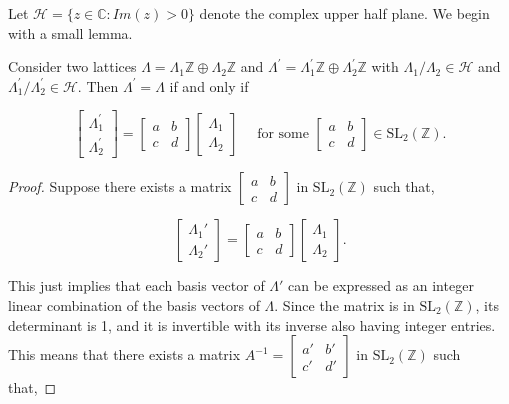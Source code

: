 Let $\mathcal{H}= \{ z \in \mathbb{C} : Im(z) > 0 \}$ denote the complex upper half plane. We begin with a small lemma.
\begin{lemma}
Consider two lattices $\Lambda=\Lambda_{1} \mathbb{Z} \oplus \Lambda_{2} \mathbb{Z}$ and $\Lambda^{\prime}=\Lambda_{1}^{\prime} \mathbb{Z} \oplus \Lambda_{2}^{\prime} \mathbb{Z}$ with $\Lambda_{1} / \Lambda_{2} \in \mathcal{H}$ and $\Lambda_{1}^{\prime} / \Lambda_{2}^{\prime} \in \mathcal{H}$. Then $\Lambda^{\prime}=\Lambda$ if and only if

$$
\left[\begin{array}{l}
\Lambda_{1}^{\prime} \\
\Lambda_{2}^{\prime}
\end{array}\right]=\left[\begin{array}{ll}
a & b \\
c & d
\end{array}\right]\left[\begin{array}{l}
\Lambda_{1} \\
\Lambda_{2}
\end{array}\right] \quad \text { for some }\left[\begin{array}{ll}
a & b \\
c & d
\end{array}\right] \in \mathrm{SL}_{2}(\mathbb{Z}) .
$$
\begin{proof}

Suppose there exists a matrix \( \left[\begin{array}{cc} a & b \\ c & d \end{array}\right] \) in \(\mathrm{SL}_2(\mathbb{Z})\) such that,

\[ \left[\begin{array}{c} \Lambda_1' \\ \Lambda_2' \end{array}\right] = \left[\begin{array}{cc} a & b \\ c & d \end{array}\right] \left[\begin{array}{c} \Lambda_1 \\ \Lambda_2 \end{array}\right]. \]

This just implies that each basis vector of \(\Lambda'\) can be expressed as an integer linear combination of the basis vectors of \(\Lambda\). Since the matrix is in \(\mathrm{SL}_2(\mathbb{Z})\), its determinant is 1, and it is invertible with its inverse also having integer entries. This means that there exists a matrix $A^{-1}=$\( \left[\begin{array}{cc} a' & b' \\ c' & d' \end{array}\right] \) in \(\mathrm{SL}_2(\mathbb{Z})\) such that,


\end{proof}
\end{lemma}
